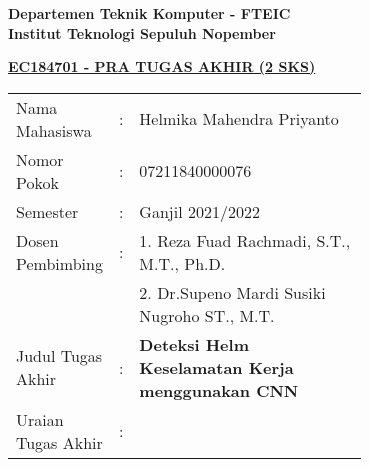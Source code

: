 \begin{flushleft}
  \textbf{Departemen Teknik Komputer - FTEIC}\\
  \textbf{Institut Teknologi Sepuluh Nopember}\\
\end{flushleft}


\begin{center}
  \underline{\textbf{EC184701 - PRA TUGAS AKHIR (2 SKS)}}
\end{center}

\begin{adjustwidth}{-0.2cm}{}
  \begin{tabular}{lcp{0.7\linewidth}}

    Nama Mahasiswa &:& Helmika Mahendra Priyanto \\
    Nomor Pokok &:& 07211840000076\\

    Semester &:& Ganjil 2021/2022 \\

    Dosen Pembimbing &:& 1. Reza Fuad Rachmadi, S.T., M.T., Ph.D. \\
    & & 2. Dr.Supeno Mardi Susiki Nugroho ST., M.T. \\

    Judul Tugas Akhir &:& \textbf{Deteksi Helm Keselamatan Kerja menggunakan CNN} \\

    Uraian Tugas Akhir &:& \\
  \end{tabular}
\end{adjustwidth}

